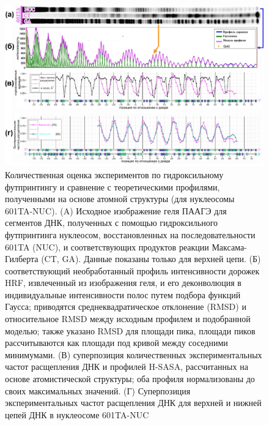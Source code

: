 \begin{figure}[H]
    \centering
    \includegraphics[width=\textwidth]{images/p5/part5_2_nar/p5_2_f5.pdf}
    \caption[Количественная оценка экспериментов по гидроксильному футпринтингу и сравнение с теоретическими профилями, полученными на основе атомной структуры (для нуклеосомы 601TA-NUC)]{Количественная оценка экспериментов по гидроксильному футпринтингу и сравнение с теоретическими профилями, полученными на основе атомной структуры (для нуклеосомы 601TA-NUC). (A) Исходное изображение геля ПААГЭ для сегментов ДНК, полученных с помощью гидроксильного футпринтинга нуклеосом, восстановленных на последовательности 601TA (NUC), и соответствующих продуктов реакции Максама-Гилберта (CT, GA). Данные показаны только для верхней цепи. (Б) соответствующий необработанный профиль интенсивности дорожек HRF, извлеченный из изображения геля, и его деконволюция в индивидуальные интенсивности полос путем подбора функций Гаусса; приводятся среднеквадратическое отклонение (RMSD) и относительное RMSD между исходным профилем и подобранной моделью; также указано RMSD для площади пика, площади пиков рассчитываются как площади под кривой между соседними минимумами. (В) суперпозиция количественных экспериментальных частот расщепления ДНК и профилей H-SASA, рассчитанных на основе атомистической структуры; оба профиля нормализованы до своих максимальных значений. (Г) Суперпозиция экспериментальных частот расщепления ДНК для верхней и нижней цепей ДНК в нуклеосоме 601TA-NUC}
    \label{fig:p5:p5_2_f5}
\end{figure}


